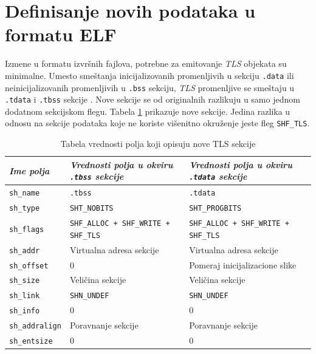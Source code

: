 \documentclass[12pt,oneside]{memoir}
\begin{document}
\section{Definisanje novih podataka u formatu ELF}
\label{sec:defElfTls}

Izmene u formatu izvršnih fajlova, potrebne za emitovanje \emph{TLS} objekata su minimalne. Umesto smeštanja inicijalizovanih promenljivih u sekciju \texttt{.data} ili neinicijalizovanih promenljivih u \texttt{.bss} sekciju, \emph{TLS} promenljive se smeštaju u \texttt{.tdata} i \texttt{.tbss} sekcije \cite{TLS}. Nove sekcije se od originalnih razlikuju u samo jednom dodatnom sekcijskom flegu. Tabela \ref{tab:tls_secs} prikazuje nove sekcije. Jedina razlika u odnosu na sekcije podataka koje ne koriste višenitno okruženje jeste fleg \texttt{SHF\_TLS}.

\begin{table}[H]
		\begin{center}
	\begin{tabular}{ | l | p{5cm} | p{5cm} |}
		\hline
		\emph{Ime polja} & \emph{Vrednosti polja u okviru \texttt{.tbss} sekcije} & \emph{Vrednosti polja u okviru \texttt{.tdata} sekcije} \\ \hline
		\texttt{sh\_name} & \texttt{.tbss} & \texttt{.tdata} \\ \hline
		\texttt{sh\_type} & \texttt{SHT\_NOBITS} & \texttt{SHT\_PROGBITS} \\ \hline
		\texttt{sh\_flags} & \texttt{SHF\_ALLOC + SHF\_WRITE + SHF\_TLS} & \texttt{SHF\_ALLOC + SHF\_WRITE + SHF\_TLS} \\ \hline
		\texttt{sh\_addr} & Virtualna adresa sekcije & Virtualna adresa sekcije \\ \hline
		\texttt{sh\_offset} & 0 & Pomeraj inicijalizacione slike \\ \hline
		\texttt{sh\_size} & Veličina sekcije & Veličina sekcije \\ \hline
		\texttt{sh\_link} & \texttt{SHN\_UNDEF} & \texttt{SHN\_UNDEF} \\ \hline
		\texttt{sh\_info} & 0 & 0 \\ \hline
		\texttt{sh\_addralign} & Poravnanje sekcije & Poravnanje sekcije \\ \hline
		\texttt{sh\_entsize} & 0 & 0 \\ \hline
	\end{tabular}
	\end{center}
	\caption{\label{tab:tls_secs}Tabela vrednosti polja koji opisuju nove TLS sekcije}
\end{table}
\end{document}
